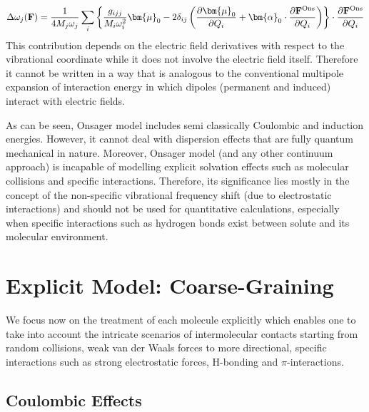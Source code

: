 \documentclass[b5paper,oneside,fleqn,11pt]{book}
\newcommand{\BM}[1]{\bm{#1}}
\newcommand{\fderiv}[2]{\ensuremath{
    \frac{\partial #1}{\partial #2}}}
\begin{document}
\begin{refsection}
%
\begin{equation} 
\Delta\omega_j({\bf F}) = \frac{1}{4M_j\omega_j}
\sum_i \left\{ \frac{g_{ijj}}{M_i\omega_i^2}  {\BM\mu}_0 - 
2\delta_{ij} \left(
\fderiv{{\BM\mu}_0}{Q_i}
+ 
 {\BM\alpha}_0 \cdot \fderiv{{\bf F}^{\rm Ons}}{Q_i}
\right)
\right\} \cdot \fderiv{{\bf F}^{\rm Ons}}{Q_i}
\end{equation}
%
This contribution depends on the electric field derivatives with respect to the vibrational
coordinate while it does not involve the electric field itself. Therefore
it cannot be written in a way that is analogous
to the conventional multipole expansion of interaction energy 
in which dipoles (permanent and induced) interact with electric fields.

As can be seen, Onsager model includes semi classically
Coulombic and induction energies. However, it cannot
deal with dispersion effects that are fully quantum mechanical
in nature. Moreover,
Onsager model (and any other continuum approach) 
is incapable of modelling
explicit solvation effects such as molecular collisions
and specific interactions. Therefore, its significance
lies mostly in the concept of the non\hyp{}specific
vibrational frequency shift (due to electrostatic
interactions) and should not be used for quantitative
calculations, especially when specific interactions such as
hydrogen bonds exist between solute and its molecular environment.


\section{Explicit Model: Coarse-Graining\label{s:vibr-solv-explicit-models}}

We focus now on the treatment of each molecule
explicitly which enables one to take into account
the intricate scenarios of intermolecular contacts
starting from random collisions, weak van der Waals
forces to more directional, specific interactions
such as strong electrostatic forces, H-bonding and
$\pi$-interactions.

\subsection{Coulombic Effects\label{s:dw-coul}}


\end{refsection}
\end{document}
